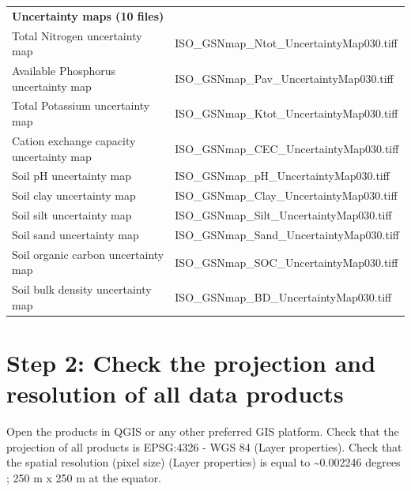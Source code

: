 \documentclass[
  10pt,
  b5paper,
  oneside]{book}
\begin{document}
\begin{table}
\begin{tabular}[t]{ll}
\multicolumn{2}{l}{\textbf{Uncertainty maps (10 files)}}\\
\hspace{1em}Total Nitrogen uncertainty map & ISO\_GSNmap\_Ntot\_UncertaintyMap030.tiff\\
\hspace{1em}Available Phosphorus uncertainty map & ISO\_GSNmap\_Pav\_UncertaintyMap030.tiff\\
\hspace{1em}Total Potassium uncertainty map & ISO\_GSNmap\_Ktot\_UncertaintyMap030.tiff\\
\hspace{1em}Cation exchange capacity uncertainty map & ISO\_GSNmap\_CEC\_UncertaintyMap030.tiff\\
\hspace{1em}Soil pH uncertainty map & ISO\_GSNmap\_pH\_UncertaintyMap030.tiff\\
\hspace{1em}Soil clay uncertainty map & ISO\_GSNmap\_Clay\_UncertaintyMap030.tiff\\
\hspace{1em}Soil silt uncertainty map & ISO\_GSNmap\_Silt\_UncertaintyMap030.tiff\\
\hspace{1em}Soil sand uncertainty map & ISO\_GSNmap\_Sand\_UncertaintyMap030.tiff\\
\hspace{1em}Soil organic carbon uncertainty map & ISO\_GSNmap\_SOC\_UncertaintyMap030.tiff\\
\hspace{1em}Soil bulk density uncertainty map & ISO\_GSNmap\_BD\_UncertaintyMap030.tiff\\
\bottomrule
\end{tabular}
\end{table}

\hypertarget{step-2-check-the-projection-and-resolution-of-all-data-products}{%
\section*{Step 2: Check the projection and resolution of all data products}\label{step-2-check-the-projection-and-resolution-of-all-data-products}}

Open the products in QGIS or any other preferred GIS platform. Check that the projection of all products is EPSG:4326 - WGS 84 (Layer properties). Check that the spatial resolution (pixel size) (Layer properties) is equal to \textasciitilde0.002246 degrees ; 250 m x 250 m at the equator.
\end{document}

